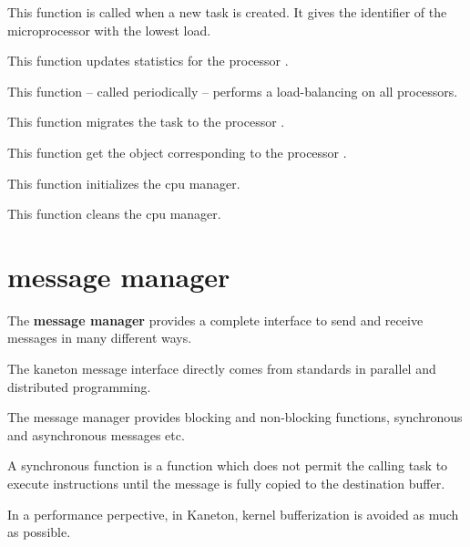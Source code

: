 	 {
	   This function is called when a new task is created. It gives
	   the identifier of the microprocessor with the lowest load.
	 }

	 {
	   This function updates statistics for the processor .

	 }

	 {
	   This function -- called periodically -- performs a
	   load-balancing on all processors.
	 }

	 {
	   This function migrates the task  to the
	   processor .
	 }

	 {
	   This function get the object corresponding to the processor
	   .
	 }

	 {
	   This function initializes the cpu manager.
	 }

	 {
	   This function cleans the cpu manager.
	 }


%
%

\section{message manager}

The \textbf{message manager} provides a complete interface to send and
receive messages in many different ways.

The kaneton message interface directly comes from standards in parallel
and distributed programming.

The message manager provides blocking and non-blocking functions,
synchronous and asynchronous messages etc.

A synchronous function is a function which does not permit the calling
task to execute instructions until the message is fully copied to the
destination buffer.

In a performance perpective, in Kaneton, kernel bufferization is avoided
as much as possible.

